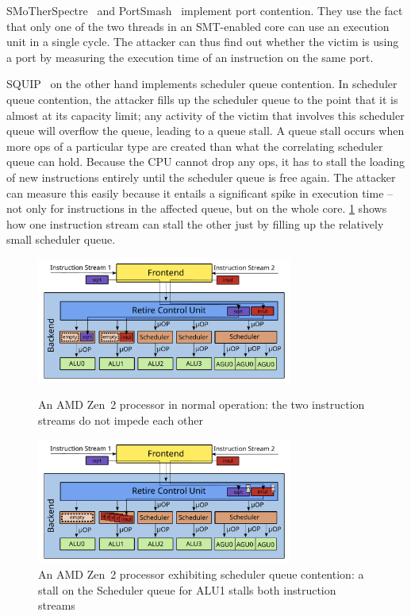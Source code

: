 \documentclass[11pt,
  titlepage=false,
]{scrreprt}
\begin{document}
SMoTherSpectre~\cite{Bhattacharyya2019} and PortSmash~\cite{Aldaya2019port} implement port contention.
They use the fact that only one of the two threads in an SMT-enabled core can use an execution unit in a single cycle.
The attacker can thus find out whether the victim is using a port by measuring the execution time of an instruction on the same port.

SQUIP~\cite{squip} on the other hand implements scheduler queue contention.
In scheduler queue contention, the attacker fills up the scheduler queue to the point that it is almost at its capacity limit;
any activity of the victim that involves this scheduler queue will overflow the queue, leading to a queue stall.
A queue stall occurs when more \textmu ops of a particular type are created than what the correlating scheduler queue can hold.
Because the CPU cannot drop any \textmu ops, it has to stall the loading of new instructions entirely until the scheduler queue is free again.
The attacker can measure this easily because it entails a significant spike in execution time --
not only for instructions in the affected queue, but on the whole core.
\ref{fig:amdzen2sqc} shows how one instruction stream can stall the other just by filling up the relatively small scheduler queue.

\begin{figure}
    \centering
    \includegraphics[width=0.75\textwidth]{figures/Zen2 normal operation}

    \caption{An AMD Zen~2 processor in normal operation: the two instruction streams do not impede each other}
    \label{fig:amdzen2normaloperation}

    \includegraphics[width=0.75\textwidth]{figures/Zen2 sqc}

    \caption{An AMD Zen~2 processor exhibiting scheduler queue contention: a stall on the Scheduler queue for ALU1 stalls both instruction streams}
    \label{fig:amdzen2sqc}
\end{figure}
\end{document}
